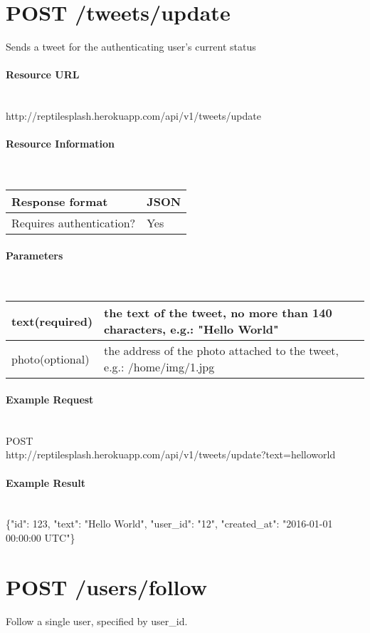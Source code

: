 \documentclass{article}
\begin{document}
	
	\section*{POST /tweets/update}
	Sends a tweet for the authenticating user’s current status
	\paragraph{Resource URL} \mbox{} \\
	http://reptilesplash.herokuapp.com/api/v1/tweets/update
	\paragraph{Resource Information} \mbox{} \\
	\begin{tabular}{ll}
		\hline
		Response format & JSON \\ \hline
		Requires authentication? & Yes \\ \hline
	\end{tabular}
	\paragraph{Parameters} \mbox{} \\
	\begin{tabular}{ll}
		\hline
		text(required) & the text of the tweet, no more than 140 characters, e.g.: "Hello World" \\ \hline
		photo(optional) & the address of the photo attached to the tweet, e.g.: /home/img/1.jpg
	\end{tabular}
	\paragraph{Example Request} \mbox{} \\
	POST \\
	http://reptilesplash.herokuapp.com/api/v1/tweets/update?text=helloworld
	\paragraph{Example Result} \mbox{} \\
	\{"id": 123, "text": "Hello World", "user\_id": "12", "created\_at": "2016-01-01 00:00:00 UTC"\}


	\section*{POST /users/follow}
	Follow a single user, specified by user\_id.
\end{document}
